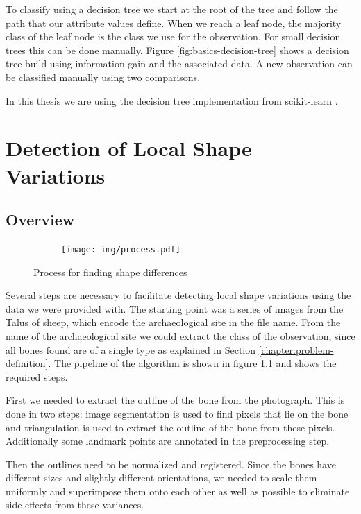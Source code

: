 \documentclass[pdftex,12pt,a4paper]{report}
\begin{document}
To classify using a decision tree we start at the root of the tree and follow the path that our attribute values define. When we reach a leaf node, the majority class of the leaf node is the class we use for the observation. For small decision trees this can be done manually. Figure \ref{fig:basics-decision-tree} shows a decision tree build using information gain and the associated data. A new observation can be classified manually using two comparisons.

In this thesis we are using the decision tree implementation from scikit-learn \cite{pedregosa2011scikit}.

\chapter{Detection of Local Shape Variations}
\label{chapter:detecting-shape-variations}

\section{Overview}

\begin{figure}[h]
	\centering
	\begin{subfigure}[b]{0.75\textwidth}
		\centering
		\texttt{[image: img/process.pdf]}
	\end{subfigure}
	\caption{Process for finding shape differences}
	\label{fig:process}
\end{figure}

Several steps are necessary to facilitate detecting local shape variations using the data we were provided with. The starting point was a series of images from the Talus of sheep, which encode the archaeological site in the file name. From the name of the archaeological site we could extract the class of the observation, since all bones found are of a single type as explained in Section \ref{chapter:problem-definition}. The pipeline of the algorithm is shown in figure \ref{fig:process} and shows the required steps.

First we needed to extract the outline of the bone from the photograph. This is done in two steps: image segmentation is used to find pixels that lie on the bone and triangulation is used to extract the outline of the bone from these pixels. Additionally some landmark points are annotated in the preprocessing step.

Then the outlines need to be normalized and registered. Since the bones have different sizes and slightly different orientations, we needed to scale them uniformly and superimpose them onto each other as well as possible to eliminate side effects from these variances.
\end{document}
